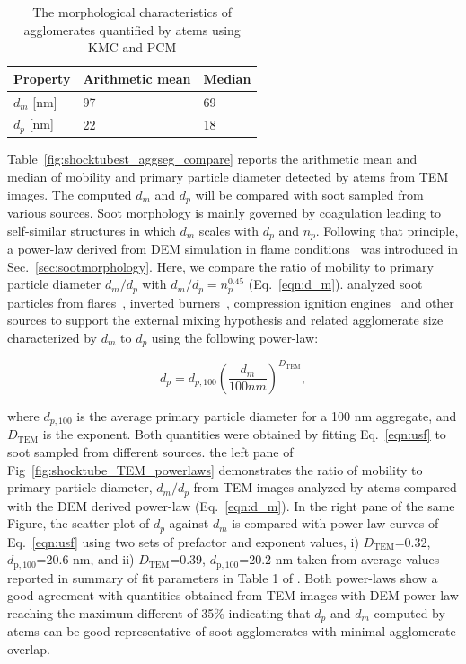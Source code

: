 \begin{table}
	\caption{The morphological characteristics of agglomerates quantified by atems using KMC and PCM}
	\label{tab:shocktube_TEM_morph}
	\centering
	\begin{tabular}{l l l}
		\hline
		Property & Arithmetic mean & Median \\
		\hline
		$d_m$ [nm] & 97 & 69 \\
		$d_p$ [nm] & 22 & 18 \\
		\hline
	\end{tabular}
\end{table}


Table~\ref{fig:shocktubest_aggseg_compare} reports the arithmetic mean and median of mobility and primary particle diameter detected by atems from TEM images. The computed $d_m$ and $d_p$ will be compared with soot sampled from various sources. Soot morphology is mainly governed by coagulation leading to self-similar structures in which $d_m$ scales with $d_p$ and $n_p$. Following that principle, a power-law derived from DEM simulation in flame conditions~\citep{Kelesidis2017} was introduced in Sec.~\ref{sec:sootmorphology}. Here, we compare the ratio of mobility to primary particle diameter $d_m/d_p$ with $d_m/d_p=n_p^{0.45}$ (Eq.~\ref{eqn:d_m}). \citet{olfert2019universal} analyzed soot particles from flares~\citep{kazemimanesh2019size}, inverted burners~\citep{dastanpour2017variation}, compression ignition engines~\citep{graves2015characterization} and other sources to support the external mixing hypothesis and related agglomerate size characterized by $d_m$ to $d_p$ using the following power-law:

\begin{equation}
	d_{p} = d_{p,100} 
	\left(
	\frac{d_m}{100 nm}
	\right)^{D_{\mathrm{TEM}}},
	\label{eqn:usf}
\end{equation}

\noindent where $d_{p,100}$ is the average primary particle diameter for a 100 nm aggregate, and $D_{\mathrm{TEM}}$ is the exponent. Both quantities were obtained by fitting Eq.~\eqref{eqn:usf} to soot sampled from different sources. the left pane of Fig~\ref{fig:shocktube_TEM_powerlaws} demonstrates the ratio of mobility to primary particle diameter, $d_m/d_p$ from TEM images analyzed by atems compared with the DEM derived power-law (Eq.~\eqref{eqn:d_m}). In the right pane of the same Figure, the scatter plot of $d_p$ against $d_m$ is compared with power-law curves of Eq.~\eqref{eqn:usf} using two sets of prefactor and exponent values, i) $D_{\mathrm{TEM}}$=0.32, $d_{\mathrm{p,100}}$=20.6 nm, and ii) $D_{\mathrm{TEM}}$=0.39, $d_{\mathrm{p,100}}$=20.2 nm taken from average values reported in summary of fit parameters in Table 1 of \citet{olfert2019universal}. Both power-laws show a good agreement with quantities obtained from TEM images with DEM power-law reaching the maximum different of 35\% indicating that $d_p$ and $d_m$ computed by atems can be good representative of soot agglomerates with minimal agglomerate overlap.

